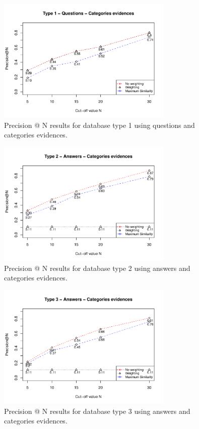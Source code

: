 \documentclass[conference]{IEEEtran}
\begin{document}
\begin{figure}[!t]
	\centering
	\includegraphics[width=3.3in]{type1questions_PAtN.pdf}
	\caption{Precision @ N results for database type 1 using questions and categories evidences.}
	\label{fig:pntype1}
\end{figure}

\begin{figure}[!t]
	\centering
	\includegraphics[width=3.3in]{type2answers_PAtN.pdf}
	\caption{Precision @ N results for database type 2 using answers and categories evidences.}
	\label{fig:pntype2}
\end{figure}

\begin{figure}[!t]
	\centering
	\includegraphics[width=3.3in]{type3answers_PAtN.pdf}
	\caption{Precision @ N results for database type 3 using answers and categories evidences.}
	\label{fig:pntype3}
\end{figure}
\end{document}
